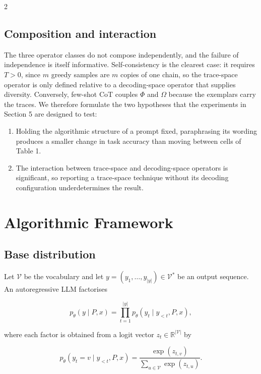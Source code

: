 \documentclass{article}
\begin{document}
\begin{multicols}{2}
\subsection{Composition and interaction}

The three operator classes do not compose independently, and the failure of independence is itself informative. Self-consistency is the clearest case: it requires $T > 0$, since $m$ greedy samples are $m$ copies of one chain, so the trace-space operator is only defined relative to a decoding-space operator that supplies diversity. Conversely, few-shot CoT couples $\Phi$ and $\Omega$ because the exemplars carry the traces. We therefore formulate the two hypotheses that the experiments in Section 5 are designed to test:

\begin{enumerate}
    \item[H1] Holding the algorithmic structure of a prompt fixed, paraphrasing its wording produces a smaller change in task accuracy than moving between cells of Table 1.
    \item[H2] The interaction between trace-space and decoding-space operators is significant, so reporting a trace-space technique without its decoding configuration underdetermines the result.
\end{enumerate}

\section{Algorithmic Framework}

\subsection{Base distribution}

Let $\mathcal{V}$ be the vocabulary and let $y = (y_1, \ldots, y_{|y|}) \in \mathcal{V}^*$ be an output sequence. An autoregressive LLM factorises

\begin{equation*}
p_\theta(y \mid P, x) = \prod_{t=1}^{|y|} p_\theta(y_t \mid y_{<t}, P, x),
\end{equation*}

where each factor is obtained from a logit vector $z_t \in \mathbb{R}^{|\mathcal{V}|}$ by

\begin{equation*}
p_\theta(y_t = v \mid y_{<t}, P, x) = \frac{\exp(z_{t,v})}{\sum_{u \in \mathcal{V}} \exp(z_{t,u})}.
\end{equation*}

\end{multicols}
\end{document}
